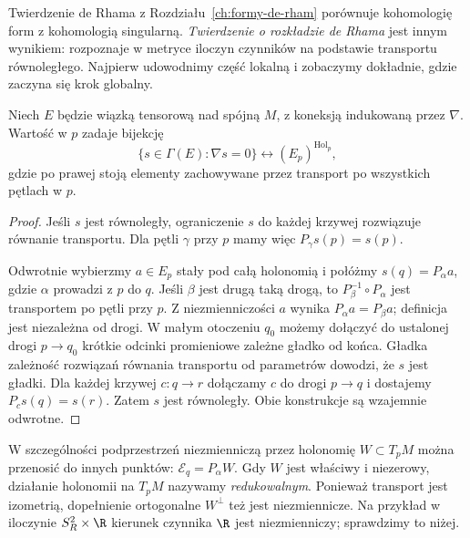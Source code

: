 Twierdzenie de Rhama z Rozdziału~\ref{ch:formy-de-rham}
porównuje kohomologię form z kohomologią singularną.
\emph{Twierdzenie o rozkładzie de Rhama} jest innym
wynikiem: rozpoznaje w metryce iloczyn czynników na
podstawie transportu równoległego. Najpierw udowodnimy
część lokalną i zobaczymy dokładnie, gdzie zaczyna się
krok globalny.

\begin{stwierdzenie}
\label{prop:zasada-holonomii}
Niech $E$ będzie wiązką tensorową nad spójną $M$,
z koneksją indukowaną przez $\nabla$. Wartość w $p$
zadaje bijekcję
\[
 \{s\in\Gamma(E):\nabla s=0\}
 \longleftrightarrow (E_p)^{\operatorname{Hol}_p},
\]
gdzie po prawej stoją elementy zachowywane przez
transport po wszystkich pętlach w $p$.
\end{stwierdzenie}
\begin{proof}
Jeśli $s$ jest równoległy, ograniczenie $s$ do każdej
krzywej rozwiązuje równanie transportu. Dla pętli
$\gamma$ przy $p$ mamy więc $P_\gamma s(p)=s(p)$.

Odwrotnie wybierzmy $a\in E_p$ stały pod całą
holonomią i połóżmy $s(q)=P_\alpha a$, gdzie
$\alpha$ prowadzi z $p$ do $q$. Jeśli $\beta$ jest
drugą taką drogą, to $P_\beta^{-1}\circ P_\alpha$
jest transportem po pętli przy $p$. Z niezmienniczości
$a$ wynika $P_\alpha a=P_\beta a$; definicja jest
niezależna od drogi. W małym otoczeniu $q_0$ możemy
dołączyć do ustalonej drogi $p\to q_0$ krótkie odcinki
promieniowe zależne gładko od końca. Gładka zależność
rozwiązań równania transportu od parametrów dowodzi,
że $s$ jest gładki. Dla każdej krzywej $c:q\to r$
dołączamy $c$ do drogi $p\to q$ i dostajemy
$P_c s(q)=s(r)$. Zatem $s$ jest równoległy.
Obie konstrukcje są wzajemnie odwrotne.
\end{proof}

W szczególności podprzestrzeń niezmienniczą przez holonomię
$W\subset T_pM$ można przenosić do innych punktów:
$\mathcal E_q=P_\alpha W$. Gdy $W$ jest właściwy
i niezerowy, działanie holonomii na $T_pM$ nazywamy
\emph{redukowalnym}. Ponieważ transport jest izometrią,
dopełnienie ortogonalne $W^\perp$ też jest niezmiennicze.
Na przykład w iloczynie $S_R^2\times\R$ kierunek
czynnika $\R$ jest niezmienniczy; sprawdzimy to niżej.

